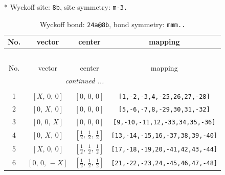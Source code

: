 \documentclass[fleqn,8pt]{jsarticle}
\begin{document}
* Wyckoff site: {\tt 8b}, site symmetry: {\tt m-3.}
\renewcommand{\arraystretch}{1.2}
\begin{longtable}{cccc}
\caption{Wyckoff bond: {\tt 24a@8b}, bond symmetry: {\tt mmm..}}
 \\
 \hline \hline
No. & vector & center & mapping \\ \hline \endfirsthead

\multicolumn{3}{l}{\tablename\ \thetable{}} \\
 \hline \hline
No. & vector & center & mapping \\ \hline \endhead

 \hline \hline
\multicolumn{3}{r}{\footnotesize\it continued ...} \\ \endfoot

 \hline \hline
\multicolumn{3}{r}{} \\ \endlastfoot

1 & $\left[ X,\, 0,\, 0 \right]$ & $\left[ 0,\, 0,\, 0 \right]$ & {\tt [1,-2,-3,4,-25,26,27,-28]} \\ \hline
2 & $\left[ 0,\, X,\, 0 \right]$ & $\left[ 0,\, 0,\, 0 \right]$ & {\tt [5,-6,-7,8,-29,30,31,-32]} \\ \hline
3 & $\left[ 0,\, 0,\, X \right]$ & $\left[ 0,\, 0,\, 0 \right]$ & {\tt [9,-10,-11,12,-33,34,35,-36]} \\ \hline
4 & $\left[ 0,\, X,\, 0 \right]$ & $\left[ \frac{1}{2},\, \frac{1}{2},\, \frac{1}{2} \right]$ & {\tt [13,-14,-15,16,-37,38,39,-40]} \\ \hline
5 & $\left[ X,\, 0,\, 0 \right]$ & $\left[ \frac{1}{2},\, \frac{1}{2},\, \frac{1}{2} \right]$ & {\tt [17,-18,-19,20,-41,42,43,-44]} \\ \hline
6 & $\left[ 0,\, 0,\, - X \right]$ & $\left[ \frac{1}{2},\, \frac{1}{2},\, \frac{1}{2} \right]$ & {\tt [21,-22,-23,24,-45,46,47,-48]} \\
\end{longtable}
\renewcommand{\arraystretch}{1.2}
\end{document}
